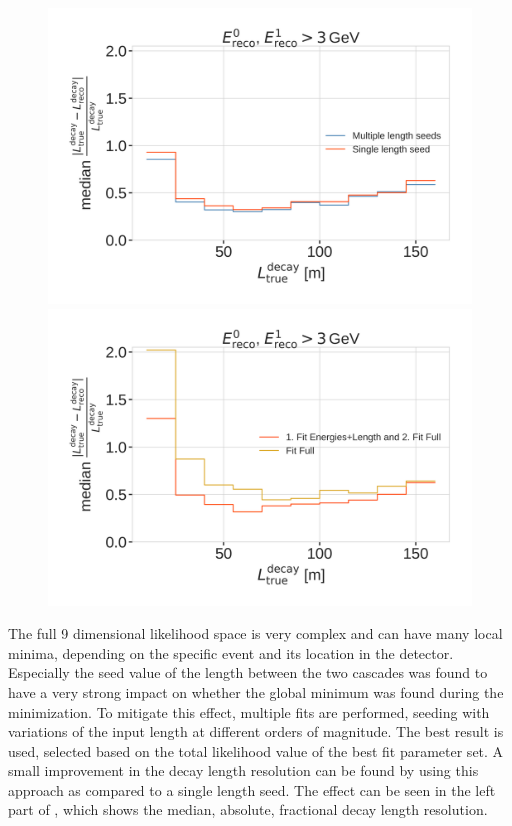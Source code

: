 \begin{figure}[h]
	\centering
    \includegraphics[width=0.49\linewidth]{figures/results/190605_reco_optimization/decay_length_seeding_median_decay_length_resolution_Good + L7 + reco E1,E2 above 3_fix_y.png}
    \includegraphics[width=0.49\linewidth]{figures/results/190605_reco_optimization/fit_routine_splitting_median_decay_length_resolution_Good + L7 + reco E1,E2 above 3_fix_y.png}
    \caption[]{}
\end{figure}

The full 9 dimensional likelihood space is very complex and can have many local minima, depending on the specific event and its location in the detector. Especially the seed value of the length between the two cascades was found to have a very strong impact on whether the global minimum was found during the minimization. To mitigate this effect, multiple fits are performed, seeding with variations of the input length at different orders of magnitude. The best result is used, selected based on the total likelihood value of the best fit parameter set. A small improvement in the decay length resolution can be found by using this approach as compared to a single length seed. The effect can be seen in the left part of , which shows the median, absolute, fractional decay length resolution.


